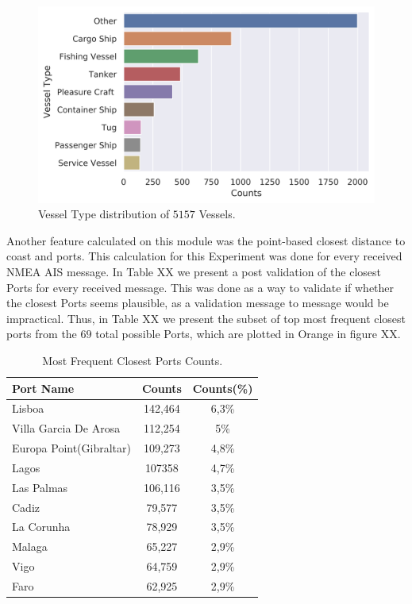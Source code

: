 \begin{figure}[H]
	\centering
	\includegraphics[scale = .7]{figures/Ch5/DataValidationVesselType.png}
    \caption{Vessel Type distribution of $5157$ Vessels.}
    \label{fig: Exp1 - Vessel Type Distribution}
\end{figure}


Another feature calculated on this module was the point-based closest distance to coast and ports. This calculation for this Experiment was done for every received NMEA AIS message. In Table XX we present a post validation of the closest Ports for every received message. This was done as a way to validate if whether the closest Ports seems plausible, as a validation message to message would be impractical. Thus, in Table XX we present the subset of top most frequent closest ports from the $69$ total possible Ports, which are plotted in Orange in figure XX.

\begin{table}[H]
\centering
\caption{Most Frequent Closest Ports Counts.}
\label{my-label}
\begin{tabular}{@{}lcc@{}}
\toprule
Port Name & Counts & Counts(\%) \\ \midrule
Lisboa & 142,464 & 6,3\% \\
Villa Garcia De Arosa & 112,254 & 5\% \\
Europa Point(Gibraltar) & 109,273 & 4,8\% \\
Lagos & 107358 & 4,7\% \\
Las Palmas & 106,116 & 3,5\% \\
Cadiz & 79,577 & 3,5\% \\
La Corunha & 78,929 & 3,5\% \\
Malaga & 65,227 & 2,9\% \\
Vigo & 64,759 & 2,9\% \\
Faro & 62,925 & 2,9\% \\ \bottomrule
\end{tabular}
\end{table}

